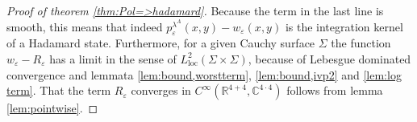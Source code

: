 \documentclass[a4paper,11pt]{article}
\begin{document}
\begin{proof}[Proof of theorem \ref{thm:Pol=>hadamard}]
Because the term in the last line is smooth, this means that indeed \(p_\varepsilon^{\lambda^A}(x,y)-w_\varepsilon(x,y)\) is the integration kernel of a Hadamard state.
Furthermore, for a given Cauchy surface \(\Sigma\) the function \(w_\varepsilon-R_\varepsilon\) has a limit in the sense of \(L^2_{\text{loc}}(\Sigma\times\Sigma)\),
because of
Lebesgue dominated convergence and
lemmata \ref{lem:bound,worstterm}, \ref{lem:bound,ivp2} and  \ref{lem:log term}. That the term \(R_\varepsilon\) 
converges in \(C^\infty(\mathbb{R}^{4+4},\mathbb{C}^{4\cdot 4})\) follows from lemma \ref{lem:pointwise}.

\end{proof}






\end{document}

